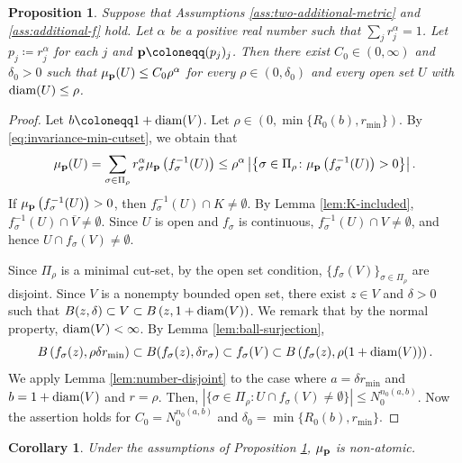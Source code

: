 \documentclass[a4paper, reqno, 11pt]{amsart}
\newtheorem{Prop}[Thm]{Proposition}
\newtheorem{Cor}[Thm]{Corollary}
\theoremstyle{definition}
\begin{document}
\begin{Prop}\label{prop:mass-dist}
Suppose that Assumptions \ref{ass:two-additional-metric} and \ref{ass:additional-f}  hold. 
Let $\alpha$ be a positive real number such that $\sum_j r_j^{\alpha} = 1$. 
Let $p_j \coloneqq r_j^{\alpha}$ for each $j$ and ${\bf p} \coloneqq (p_j)_j$. 
Then there exist $C_0 \in (0,\infty)$ and $\delta_0 > 0$ such that 
$\mu_{\bf p}(U) \le C_0 \rho^{\alpha}$ for every $\rho \in (0, \delta_0)$ and every open set $U$ with $\textup{diam}(U) \le \rho$. 
\end{Prop}

\begin{proof}
Let $b \coloneqq 1 + \textup{diam}(V)$. 
Let $\rho \in \left(0, \min\{R_0 (b), r_{\min} \}\right)$. 
By \eqref{eq:invariance-min-cutset}, we obtain that 
\[ \mu_{\bf p}(U) =  \sum_{\sigma \in \Pi_{\rho}} r_{\sigma}^{\alpha} \mu_{\bf p} \left( f_{\sigma}^{-1} (U) \right) \le \rho^{\alpha} \left|\left\{\sigma \in \Pi_{\rho} \colon \mu_{\bf p} \left( f_{\sigma}^{-1} (U) \right) > 0 \right\}\right|.  \]
If $\mu_{\bf p} \left( f_{\sigma}^{-1} (U) \right) > 0$, then $f_{\sigma}^{-1} (U) \cap K \ne \emptyset$. 
By Lemma \ref{lem:K-included}, $f_{\sigma}^{-1} (U) \cap \overline{V} \ne \emptyset$. 
Since $U$ is open and $f_{\sigma}$ is continuous, 
$f_{\sigma}^{-1} (U) \cap V \ne \emptyset$, and hence $U \cap f_{\sigma}(V) \ne \emptyset$. 

Since $\Pi_{\rho}$ is a minimal cut-set, by the open set condition, 
$\{ f_{\sigma}(V) \}_{\sigma \in \Pi_{\rho}}$ are disjoint. 
Since $V$ is a nonempty bounded open set, 
there exist $z \in V$ and $\delta > 0$ such that 
$B(z,\delta) \subset V \subset B\left(z, 1+\textup{diam}(V) \right)$. 
We remark that by the normal property, $\textup{diam}(V) < \infty$.  
By Lemma \ref{lem:ball-surjection}, 
\[ B\left(f_{\sigma}(z), \rho \delta r_{\min}\right) \subset B(f_{\sigma}(z), \delta r_{\sigma}) \subset f_{\sigma}(V) \subset B\left(f_{\sigma}(z), \rho(1+ \textup{diam}(V))\right).\] 
 We apply Lemma \ref{lem:number-disjoint} to the case where $a = \delta r_{\min}$ and $b = 1+\textup{diam}(V)$ and $r = \rho$. 
 Then, $|\{\sigma \in \Pi_{\rho} \colon U \cap f_{\sigma}(V) \ne \emptyset\}| \le N_0^{n_0 (a,b)}$. 
 Now the assertion holds for $C_0 =  N_0^{n_0 (a,b)}$ and $\delta_0 = \min\{R_0 (b), r_{\min} \}$. 
\end{proof}

\begin{Cor}\label{cor:non-atomic}
Under the assumptions of Proposition \ref{prop:mass-dist}, $\mu_{\bf p}$ is non-atomic.
\end{Cor}
\end{document}
